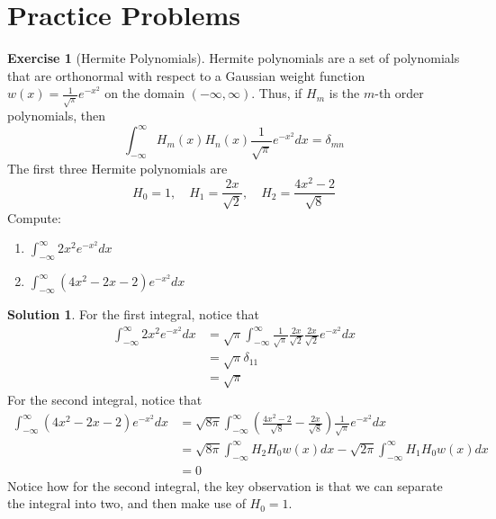 \documentclass[12pt]{article}
\theoremstyle{definition}
\newtheorem{exercise}{\color{YellowOrange}Exercise}
\theoremstyle{definition}
\newtheorem{solution}{\color{Goldenrod}Solution}
\begin{document}
\section{Practice Problems}
\begin{exercise}[Hermite Polynomials]
	Hermite polynomials are a set of polynomials that are orthonormal with respect to a Gaussian weight function $w(x) = \frac{1}{\sqrt{\pi}} e^{-x^2}$ on the domain $(-\infty, \infty)$. Thus, if $H_m$ is the $m$-th order polynomials, then
	\begin{equation}
		\int_{-\infty}^\infty H_m(x)H_n(x)\frac{1}{\sqrt{\pi}} e^{-x^2} dx = \delta_{mn}
	\end{equation}
	The first three Hermite polynomials are
	\begin{equation*}
		H_0 = 1, \quad H_1 = \frac{2x}{\sqrt{2}}, \quad H_2 = \frac{4x^2 - 2}{\sqrt{8}}
	\end{equation*}
	Compute:
	\begin{enumerate}
		\item $\int_{-\infty}^\infty 2x^2 e^{-x^2}dx$
		\item $\int_{-\infty}^\infty (4x^2 - 2x - 2) e^{-x^2}dx$
	\end{enumerate}
\end{exercise}
\begin{solution}
	For the first integral, notice that
	\begin{align*}
		\int_{-\infty}^\infty 2x^2 e^{-x^2}dx &= \sqrt{\pi} \int_{-\infty}^\infty \frac{1}{\sqrt{\pi}} \frac{2x}{\sqrt{2}} \frac{2x}{\sqrt{2}} e^{-x^2}dx \\
		&= \sqrt{\pi} \delta_{11} \\
		&= \sqrt{\pi}
	\end{align*}
	For the second integral, notice that
	\begin{align*}
		\int_{-\infty}^\infty (4x^2 - 2x - 2) e^{-x^2}dx &= \sqrt{8\pi} \int_{-\infty}^\infty \left(\frac{4x^2 - 2}{\sqrt{8}} - \frac{2x}{\sqrt{8}}\right) \frac{1}{\sqrt{\pi}}e^{-x^2}dx \\
		&= \sqrt{8\pi}\int_{-\infty}^\infty H_2H_0 w(x)dx -  \sqrt{2\pi}\int_{-\infty}^\infty H_1 H_0 w(x) dx \\
		&= 0
	\end{align*}
	Notice how for the second integral, the key observation is that we can separate the integral into two, and then make use of $H_0 = 1$. 
\end{solution}
\end{document}
